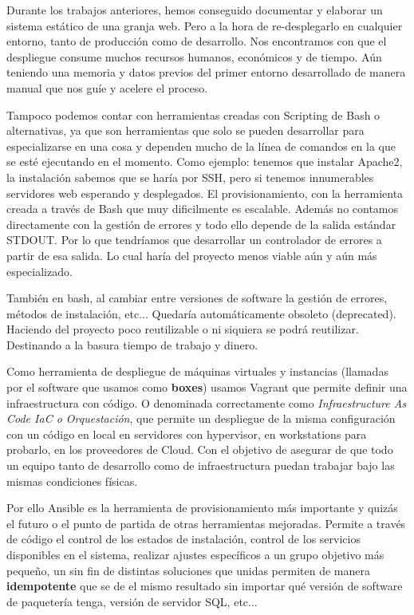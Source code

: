 Durante los trabajos anteriores, hemos conseguido documentar y elaborar un sistema estático de una granja web. Pero a la hora de re-desplegarlo en cualquier entorno,
tanto de producción como de desarrollo. Nos encontramos con que el despliegue consume muchos recursos humanos, económicos y de tiempo. Aún teniendo una memoria y datos
previos del primer entorno desarrollado de manera manual que nos guíe y acelere el proceso.
\vspace{5mm}

Tampoco podemos contar con herramientas creadas con Scripting de Bash o alternativas, ya que son herramientas que solo se pueden desarrollar para especializarse en una cosa y dependen mucho de la línea de comandos en la que se esté ejecutando en el momento. Como ejemplo: tenemos que instalar Apache2, la instalación sabemos que se haría por SSH, pero si tenemos innumerables servidores web esperando y desplegados. El provisionamiento, con la herramienta creada a través de Bash que muy dificilmente es escalable. Además no contamos directamente con la gestión de errores y todo ello depende de la salida estándar STDOUT. Por lo que tendríamos que desarrollar un controlador de errores a partir de esa salida. Lo cual haría del proyecto menos viable aún y aún más especializado.
\vspace{5mm}

También en bash, al cambiar entre versiones de software la gestión de errores, métodos de instalación, etc... Quedaría automáticamente obsoleto (deprecated). Haciendo del proyecto poco reutilizable o ni siquiera se podrá reutilizar. Destinando a la basura tiempo de trabajo y dinero.
\vspace{5mm}

Como herramienta de despliegue de máquinas virtuales y instancias (llamadas por el software que usamos como \textbf{boxes}) usamos Vagrant que permite definir una infraestructura con código. O denominada correctamente como \emph{Infraestructure As Code IaC o Orquestación}, que permite un despliegue de la misma configuración con un código en local en servidores con hypervisor, en workstations para probarlo, en los proveedores de Cloud. Con el objetivo de asegurar de que todo un equipo tanto de desarrollo como de infraestructura puedan trabajar bajo las mismas condiciones físicas.
\vspace{5mm}

Por ello Ansible es la herramienta de provisionamiento más importante y quizás el futuro o el punto de partida de otras herramientas mejoradas. Permite a través de código el control de los estados de instalación, control de los servicios disponibles en el sistema, realizar ajustes específicos a un grupo objetivo más pequeño, un sin fin de distintas soluciones que unidas permiten de manera \textbf{idempotente} que se de el mismo resultado sin importar qué versión de software de paquetería tenga, versión de servidor SQL, etc...
\vspace{5mm}

